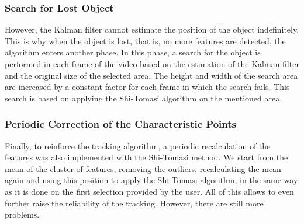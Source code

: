 \subsubsection{Search for Lost Object}

However, the Kalman filter cannot estimate the position of the object indefinitely. This is why when the object is lost, that is, no more features are detected, the algorithm enters another phase. In this phase, a search for the object is performed in each frame of the video based on the estimation of the Kalman filter and the original size of the selected area. The height and width of the search area are increased by a constant factor for each frame in which the search fails. This search is based on applying the Shi-Tomasi algorithm on the mentioned area.


\subsubsection{Periodic Correction of the Characteristic Points}

Finally, to reinforce the tracking algorithm, a periodic recalculation of the features was also implemented with the Shi-Tomasi method. We start from the mean of the cluster of features, removing the outliers, recalculating the mean again and using this position to apply the Shi-Tomasi algorithm, in the same way as it is done on the first selection provided by the user. All of this allows to even further raise the reliability of the tracking. However, there are still more problems.


